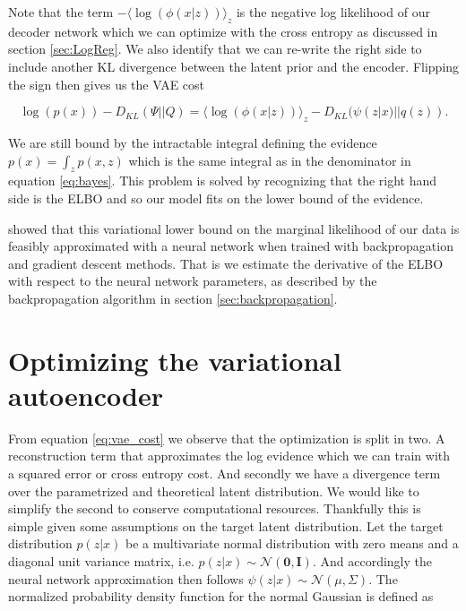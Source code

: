 \noindent Note that the term $-\langle \log \left( \phi( x | z)\right) \rangle_z$ is the negative log likelihood of our decoder network which we can optimize with the cross entropy as discussed in section \ref{sec:LogReg}. We also identify that we can re-write the right side to include another KL divergence between the latent prior and the encoder. Flipping the sign then gives us the VAE cost

\begin{equation}\label{eq:vae_cost}
\log(p(x)) - D_{KL}(\Psi || Q )=  \langle \log \left( \phi( x | z)\right) \rangle_z - D_{KL}(\psi(z|x)|| q(z)).
\end{equation}
 
\noindent We are still bound by the intractable integral defining the evidence $p(x) = \int_z p(x, z)$ which is the same integral as in the denominator in equation \ref{eq:bayes}. This problem is solved by recognizing that the right hand side is the ELBO and so our model fits on the lower bound of the evidence.

\citet{Kingma2013} showed that this variational lower bound on the marginal likelihood of our data is feasibly approximated with a neural network when trained with backpropagation and gradient descent methods. That is we estimate the derivative of the ELBO with respect to the neural network parameters, as described by the backpropagation algorithm in section \ref{sec:backpropagation}.

\section{Optimizing the variational autoencoder}

From equation \ref{eq:vae_cost} we observe that the optimization is split in two. A reconstruction term that approximates the log evidence which we can train with a squared error or cross entropy cost. And secondly we have a divergence term over the parametrized and theoretical latent distribution. We would like to simplify the second to conserve computational resources. Thankfully this is simple given some assumptions on the target latent distribution. Let the target distribution $p(z | x) $ be a multivariate normal distribution with zero means and a diagonal unit variance matrix, i.e. $p(z | x) \sim  \mathcal{N}(\mathbf{0}, \mathbf{I})$. And accordingly the neural network approximation then follows $\psi(z | x) \sim \mathcal{N}(\mu, \Sigma)$. The normalized probability density function for the normal Gaussian is defined as 

